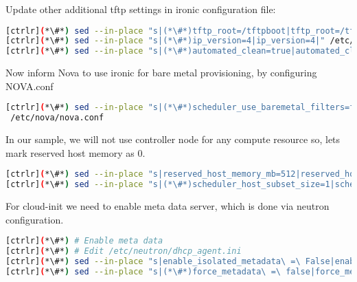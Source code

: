 Update other additional tftp settings in ironic configuration file:


\begin{lstlisting}[language=bash,keywords={}]
[ctrlr](*\#*) sed --in-place "s|(*\#*)tftp_root=/tftpboot|tftp_root=/tftpboot|" /etc/ironic/ironic.conf
[ctrlr](*\#*) sed --in-place "s|(*\#*)ip_version=4|ip_version=4|" /etc/ironic/ironic.conf
[ctrlr](*\#*) sed --in-place "s|(*\#*)automated_clean=true|automated_clean=false|" /etc/ironic/ironic.conf
\end{lstlisting} 

Now inform Nova to use ironic for bare metal provisioning, by configuring NOVA.conf


\begin{lstlisting}[language=bash,keywords={}]
[ctrlr](*\#*) sed --in-place "s|(*\#*)scheduler_use_baremetal_filters=false|scheduler_use_baremetal_filters=true|" \
 /etc/nova/nova.conf
\end{lstlisting} 

In our sample, we will not use controller node for any compute resource so, lets mark reserved host memory as 0.


\begin{lstlisting}[language=bash,keywords={}]
[ctrlr](*\#*) sed --in-place "s|reserved_host_memory_mb=512|reserved_host_memory_mb=0|" /etc/nova/nova.conf
[ctrlr](*\#*) sed --in-place "s|(*\#*)scheduler_host_subset_size=1|scheduler_host_subset_size=9999999|" /etc/nova/nova.conf
\end{lstlisting} 

For cloud-init we need to enable meta data server, which is done via neutron configuration.


\begin{lstlisting}[language=bash,keywords={}]
[ctrlr](*\#*) # Enable meta data
[ctrlr](*\#*) # Edit /etc/neutron/dhcp_agent.ini
[ctrlr](*\#*) sed --in-place "s|enable_isolated_metadata\ =\ False|enable_isolated_metadata\ =\ True|" /etc/neutron/dhcp_agent.ini
[ctrlr](*\#*) sed --in-place "s|(*\#*)force_metadata\ =\ false|force_metadata\ =\ True|" \ /etc/neutron/dhcp_agent.ini
\end{lstlisting} 

